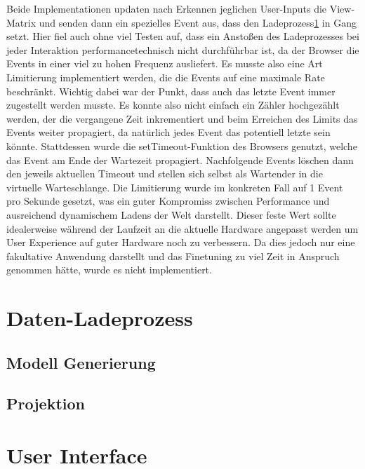 Beide Implementationen updaten nach Erkennen jeglichen User-Inputs die View-Matrix und senden dann ein spezielles Event aus, dass den Ladeprozess\ref{dataLoading} in Gang setzt. Hier fiel auch ohne viel Testen auf, dass ein Anstoßen des Ladeprozesses bei jeder Interaktion performancetechnisch nicht durchführbar ist, da der Browser die Events in einer viel zu hohen Frequenz ausliefert. Es musste also eine Art Limitierung implementiert werden, die die Events auf eine maximale Rate beschränkt. Wichtig dabei war der Punkt, dass auch das letzte Event immer zugestellt werden musste. Es konnte also nicht einfach ein Zähler hochgezählt werden, der die vergangene Zeit inkrementiert und beim Erreichen des Limits das Events weiter propagiert, da natürlich jedes Event das potentiell letzte sein könnte. Stattdessen wurde die setTimeout-Funktion des Browsers genutzt, welche das Event am Ende der Wartezeit propagiert. Nachfolgende Events löschen dann den jeweils aktuellen Timeout und stellen sich selbst als Wartender in die virtuelle Warteschlange. Die Limitierung wurde im konkreten Fall auf 1 Event pro Sekunde gesetzt, was ein guter Kompromiss zwischen Performance und ausreichend dynamischem Ladens der Welt darstellt. Dieser feste Wert sollte idealerweise während der Laufzeit an die aktuelle Hardware angepasst werden um User Experience auf guter Hardware noch zu verbessern. Da dies jedoch nur eine fakultative Anwendung darstellt und das Finetuning zu viel Zeit in Anspruch genommen hätte, wurde es nicht implementiert.

\section{Daten-Ladeprozess}\label{dataLoading}


\subsection{Modell Generierung}

\subsection{Projektion}

\section{User Interface}

